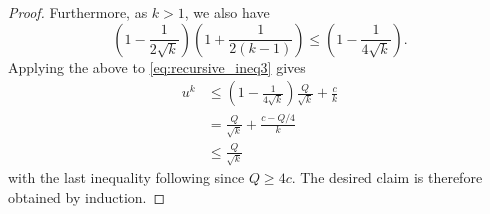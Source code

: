 \begin{toappendix}
\begin{proof}
    Furthermore, as $k>1$, we also have
    \begin{equation*}
        \left(1-\frac{1}{2\sqrt{k}}\right)\left(1+\frac{1}{2(k-1)}\right)\leq \left(1-\frac{1}{4\sqrt{k}}\right).
    \end{equation*}
    Applying the above to \eqref{eq:recursive_ineq3} gives
    \begin{equation*}
        \begin{aligned}
            u^k
                &\leq \left(1-\frac{1}{4\sqrt{k}}\right)\frac{Q}{\sqrt{k}}+\frac{c}{k}\\
                &= \frac{Q}{\sqrt{k}} + \frac{c-Q/4}{k}\\
                &\leq \frac{Q}{\sqrt{k}}
        \end{aligned}
    \end{equation*}
    with the last inequality following since $Q\geq 4c$.
    The desired claim is therefore obtained by induction.
\end{proof}

\end{toappendix}
